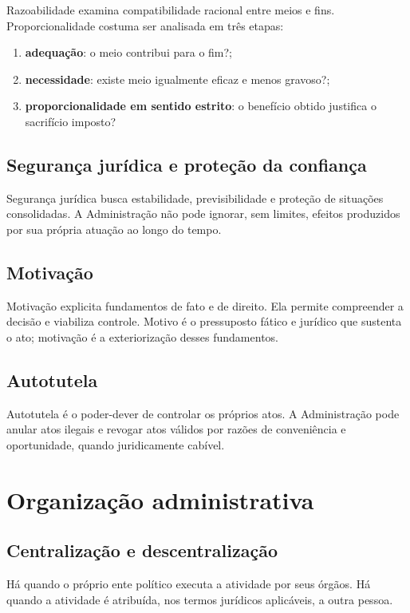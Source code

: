 Razoabilidade examina compatibilidade racional entre meios e fins. Proporcionalidade costuma ser analisada em três etapas:
\begin{enumerate}
\item \textbf{adequação}: o meio contribui para o fim?;
\item \textbf{necessidade}: existe meio igualmente eficaz e menos gravoso?;
\item \textbf{proporcionalidade em sentido estrito}: o benefício obtido justifica o sacrifício imposto?
\end{enumerate}

\subsection{Segurança jurídica e proteção da confiança}

Segurança jurídica busca estabilidade, previsibilidade e proteção de situações consolidadas. A Administração não pode ignorar, sem limites, efeitos produzidos por sua própria atuação ao longo do tempo.

\subsection{Motivação}

Motivação explicita fundamentos de fato e de direito. Ela permite compreender a decisão e viabiliza controle. Motivo é o pressuposto fático e jurídico que sustenta o ato; motivação é a exteriorização desses fundamentos.

\subsection{Autotutela}

Autotutela é o poder-dever de controlar os próprios atos. A Administração pode anular atos ilegais e revogar atos válidos por razões de conveniência e oportunidade, quando juridicamente cabível.

\section{Organização administrativa}

\subsection{Centralização e descentralização}

Há  quando o próprio ente político executa a atividade por seus órgãos. Há  quando a atividade é atribuída, nos termos jurídicos aplicáveis, a outra pessoa.

